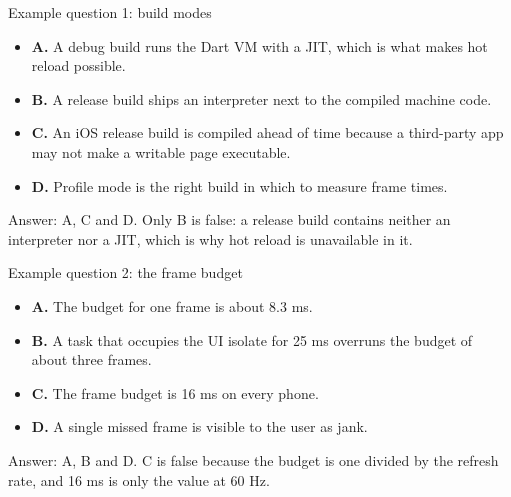 \documentclass[10pt,aspectratio=169,t]{beamer}
\begin{document}
\begin{frame}[eyebrow=Exam]{Example question 1: build modes}
  \vskip 1mm
  \vskip 2mm
  \begin{itemize}
    \item \textbf{A.} A debug build runs the Dart VM with a JIT, which is what makes hot reload possible.
    \item \textbf{B.} A release build ships an interpreter next to the compiled machine code.
    \item \textbf{C.} An iOS release build is compiled ahead of time because a third-party app may not make a writable page executable.
    \item \textbf{D.} Profile mode is the right build in which to measure frame times.
  \end{itemize}
  \begin{takeaway}{Answer: A, C and D.}
    Only B is false: a release build contains neither an interpreter nor a JIT, which is why hot reload is unavailable in it.
  \end{takeaway}
\end{frame}

\begin{frame}[eyebrow=Exam]{Example question 2: the frame budget}
  \vskip 1mm
  \vskip 2mm
  \begin{itemize}
    \item \textbf{A.} The budget for one frame is about 8.3 ms.
    \item \textbf{B.} A task that occupies the UI isolate for 25 ms overruns the budget of about three frames.
    \item \textbf{C.} The frame budget is 16 ms on every phone.
    \item \textbf{D.} A single missed frame is visible to the user as jank.
  \end{itemize}
  \begin{takeaway}{Answer: A, B and D.}
    C is false because the budget is one divided by the refresh rate, and 16 ms is only the value at 60 Hz.
  \end{takeaway}
\end{frame}
\end{document}
